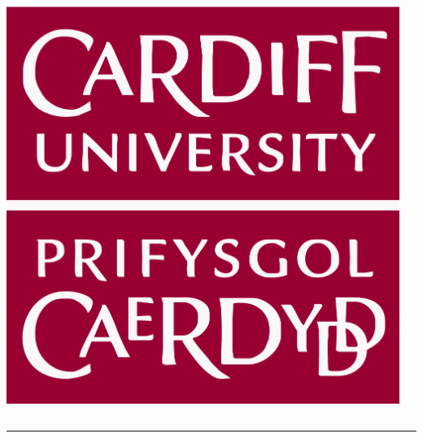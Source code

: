 \documentclass[usenames,dvipsnames,t]{beamer}
\begin{document}
\begin{columns}
\begin{column}{.1\linewidth}
        \begin{center}
            \includegraphics[width=.7\textwidth]{static/cardiff_uni_logo}
        \end{center}
        \end{column}

    \begin{column}{.02\linewidth}
    \end{column}
\end{columns}
\vspace{1cm}

\hrule height 3pt
\vspace{1cm}


\vspace{1cm}
\end{document}
